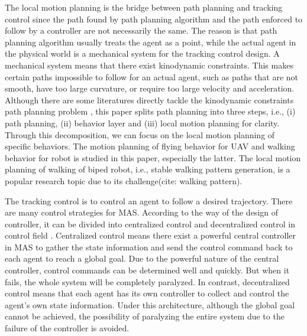 \documentclass{ieeeaccess}
\begin{document}

The local motion planning is the bridge between path planning and tracking control since the path found by path planning algorithm and the path enforced to follow by a controller are not necessarily the same. The reason is that path planning algorithm usually treats the agent as a point, while the actual agent in the physical world is a mechanical system for the tracking control design. A mechanical system means that there exist kinodynamic constraints. This makes certain paths impossible to follow for an actual agent, such as paths that are not smooth, have too large curvature, or require too large velocity and acceleration. Although there are some literatures directly tackle the kinodynamic constraints path planning problem \cite{9384209}, this paper splits path planning into three steps, i.e., (i) path planning, (ii) behavior layer and (iii) local motion planning for clarity. Through this decomposition, we can focus on the local motion planning of specific behaviors. The motion planning of flying behavior for UAV and walking behavior for robot is studied in this paper, especially the latter. The local motion planning of walking of biped robot, i.e., stable walking pattern generation, is a popular research topic due to its challenge(cite: walking pattern).

The tracking control is to control an agent to follow a desired trajectory. There are many control strategies for MAS. According to the way of the design of controller, it can be divided into centralized control and decentralized control in control field \cite{8931370}. Centralized control means there exist a powerful central controller in MAS to gather the state information and send the control command back to each agent to reach a global goal. Due to the powerful nature of the central controller, control commands can be determined well and quickly. But when it fails, the whole system will be completely paralyzed. In contrast, decentralized control means that each agent has its own controller to collect and control the agent's own state information. Under this architecture, although the global goal cannot be achieved, the possibility of paralyzing the entire system due to the failure of the controller is avoided.
\end{document}
